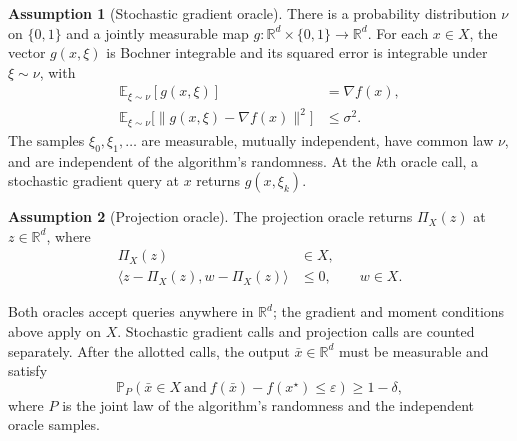 \documentclass[10pt]{article}
\theoremstyle{definition}
\newtheorem{assumption}{Assumption}
\begin{document}
\begin{assumption}[Stochastic gradient oracle]
There is a probability distribution $\nu$ on $\{0,1\}$ and a jointly measurable map
$g:\mathbb{R}^d\times\{0,1\}\to\mathbb{R}^d$.
For each $x\in X$, the vector $g(x,\xi)$ is Bochner integrable and its squared error is integrable under $\xi\sim\nu$, with
\[
\begin{aligned}
\mathbb{E}_{\xi\sim\nu}[g(x,\xi)]&=\nabla f(x),\\
\mathbb{E}_{\xi\sim\nu}\bigl[\|g(x,\xi)-\nabla f(x)\|^2\bigr]
&\leq\sigma^2.
\end{aligned}
\]
The samples $\xi_0,\xi_1,\ldots$ are measurable, mutually independent, have common law $\nu$, and are independent of the algorithm's randomness. At the $k$th oracle call, a stochastic gradient query at $x$ returns $g(x,\xi_k)$.
\end{assumption}

\begin{assumption}[Projection oracle]
The projection oracle returns $\Pi_X(z)$ at $z\in\mathbb{R}^d$, where
\[
\begin{aligned}
\Pi_X(z)&\in X,\\
\langle z-\Pi_X(z),w-\Pi_X(z)\rangle&\leq0,
\qquad w\in X.
\end{aligned}
\]
\end{assumption}

Both oracles accept queries anywhere in $\mathbb{R}^d$; the gradient and moment conditions above apply on $X$. Stochastic gradient calls and projection calls are counted separately. After the allotted calls, the output $\bar{x}\in\mathbb{R}^d$ must be measurable and satisfy
\[
\mathbb{P}_{P}\!\left(
\bar{x}\in X\ \text{and}\ f(\bar{x})-f(x^\star)\leq\varepsilon
\right)\geq1-\delta,
\]
where $P$ is the joint law of the algorithm's randomness and the independent oracle samples.
\end{document}
